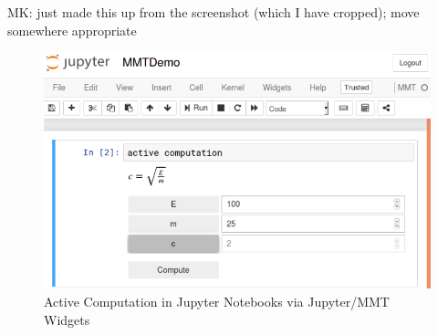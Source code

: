\begin{newpart}{MK: just made this up from the screenshot (which I have cropped); move somewhere appropriate}
\begin{figure}[ht]\centering
    \includegraphics[width=12cm]{activecomp}
    \caption{Active Computation in Jupyter Notebooks via Jupyter/MMT Widgets}\label{fig:ac}
  \end{figure}
\end{newpart}


